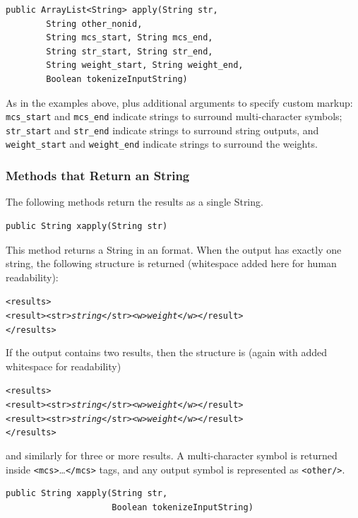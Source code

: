 \begin{Verbatim}
public ArrayList<String> apply(String str, 
        String other_nonid,
        String mcs_start, String mcs_end, 
        String str_start, String str_end,
        String weight_start, String weight_end,
        Boolean tokenizeInputString)
\end{Verbatim}

\noindent
As in the examples above, plus additional arguments to specify custom markup:  \texttt{mcs\_start} and
\texttt{mcs\_end} indicate strings to surround multi-character symbols; \texttt{str\_start} and
\texttt{str\_end} indicate strings to surround string outputs, and \texttt{weight\_start} and
\texttt{weight\_end} indicate strings to surround the weights.

\subsubsection{Methods that Return an \xml{} String}

The following methods return the results as a single \xml{} String.

\begin{Verbatim}
public String xapply(String str)
\end{Verbatim}

\noindent
This method returns a String in an \xml{} format.  When
the output has exactly one string, the following structure is returned (whitespace added here for human
readability):

\begin{alltt}
<results>
  <result><str>\emph{string}</str><w>\emph{weight}</w></result>
</results>
\end{alltt}

\noindent
If the output contains two results, then the structure is (again with added whitespace for
readability)

\begin{alltt}
<results>
  <result><str>\emph{string}</str><w>\emph{weight}</w></result>
  <result><str>\emph{string}</str><w>\emph{weight}</w></result>
</results>
\end{alltt}

\noindent
and similarly for three or more results.  A multi-character symbol is returned inside
\texttt{<mcs>}\ldots\texttt{</mcs>} tags, and any  output symbol is represented as
\texttt{<other/>}.

\begin{Verbatim}
public String xapply(String str,
                     Boolean tokenizeInputString)
\end{Verbatim}

